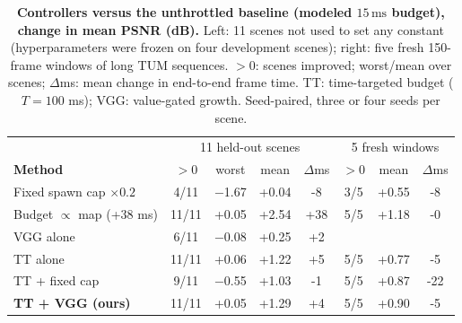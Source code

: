 \begin{table}[tbp]
\centering
\footnotesize\setlength{\tabcolsep}{2pt}
\begin{tabular}{lccccccc}
\toprule
& \multicolumn{4}{c}{11 held-out scenes} & \multicolumn{3}{c}{5 fresh windows} \\
\textbf{Method} & $>0$ & worst & mean & $\Delta$ms & $>0$ & mean & $\Delta$ms \\
\midrule
Fixed spawn cap $\times0.2$ & 4/11 & $-$1.67 & +0.04 & -8 & 3/5 & +0.55 & -8 \\
Budget $\propto$ map (+38 ms) & 11/11 & +0.05 & +2.54 & +38 & 5/5 & +1.18 & -0 \\
VGG alone & 6/11 & $-$0.08 & +0.25 & +2 &  & &  \\
TT alone & 11/11 & +0.06 & +1.22 & +5 & 5/5 & +0.77 & -5 \\
TT + fixed cap & 9/11 & $-$0.55 & +1.03 & -1 & 5/5 & +0.87 & -22 \\
\textbf{TT + VGG (ours)} & 11/11 & +0.05 & +1.29 & +4 & 5/5 & +0.90 & -5 \\
\bottomrule
\end{tabular}
\caption{\textbf{Controllers versus the unthrottled baseline (modeled $15\,\mathrm{ms}$ budget), change in mean PSNR (dB).} Left: 11 scenes not used to set any constant (hyperparameters were frozen on four development scenes); right: five fresh 150-frame windows of long TUM sequences. $>0$: scenes improved; worst/mean over scenes; $\Delta$ms: mean change in end-to-end frame time. TT: time-targeted budget ($T=100$ ms); VGG: value-gated growth. Seed-paired, three or four seeds per scene.}
\label{tab:method}
\end{table}
